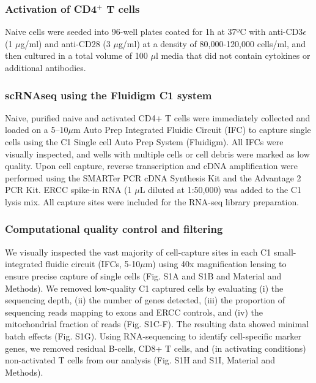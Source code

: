 \subsubsection*{Activation of CD4$^+$ T cells}

Naive cells were seeded into 96-well plates coated for 1h at 37ºC with anti-CD3$\epsilon$ (1 $\mu$g/ml) and anti-CD28 (3 $\mu$g/ml) at a density of 80,000-120,000 cells/ml, and then cultured in a total volume of 100 $\mu$l media that did not contain cytokines or additional antibodies.

\subsubsection*{scRNAseq using the Fluidigm C1 system}

Naive, purified naive and activated CD4+ T cells were immediately collected and loaded on a 5–10$\mu$m Auto Prep Integrated Fluidic Circuit (IFC) to capture single cells using the C1 Single cell Auto Prep System (Fluidigm). All IFCs were visually inspected, and wells with multiple cells or cell debris were marked as low quality. Upon cell capture, reverse transcription and cDNA amplification were performed using the SMARTer PCR cDNA Synthesis Kit and the Advantage 2 PCR Kit. ERCC spike-in RNA (1 $\mu$L diluted at 1:50,000) was added to the C1 lysis mix. All capture sites were included for the RNA-seq library preparation.

\subsubsection*{Computational quality control and filtering}

We visually inspected the vast majority of cell-capture sites in each C1 small-integrated fluidic circuit (IFCs, 5-10$\mu$m) using 40x magnification lensing to ensure precise capture of single cells (Fig. S1A and S1B and Material and Methods). We removed low-quality C1 captured cells by evaluating (i) the sequencing depth, (ii) the number of genes detected, (iii) the proportion of sequencing reads mapping to exons and ERCC controls, and (iv) the mitochondrial fraction of reads (Fig. S1C-F). The resulting data showed minimal batch effects (Fig. S1G). Using RNA-sequencing to identify cell-specific marker genes, we removed residual B-cells, CD8+ T cells, and (in activating conditions) non-activated T cells from our analysis (Fig. S1H and S1I, Material and Methods). \\

